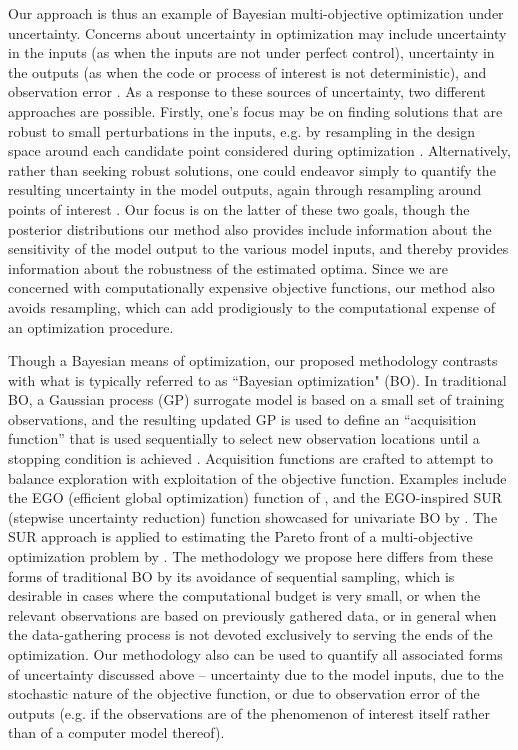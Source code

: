 \documentclass[12pt]{article}
\begin{document}
Our approach is thus an example of Bayesian multi-objective optimization under uncertainty. Concerns about uncertainty in optimization may include uncertainty in the inputs (as when the inputs are not under perfect control), uncertainty in the outputs (as when the code or process of interest is not deterministic), and observation error \citep{Jin2005}. 
%
As a response to these sources of uncertainty, two different approaches are possible.
%
Firstly, one's focus may be on finding solutions that are robust to small perturbations in the inputs, e.g. by resampling in the design space around each candidate point considered during optimization \citep{Deb2006}.
%
Alternatively, rather than seeking robust solutions, one could endeavor simply to quantify the resulting uncertainty in the model outputs, again through resampling around points of interest \citep{Zhou2011}.
%
Our focus is on the latter of these two goals, though the posterior distributions our method also provides include information about the sensitivity of the model output to the various model inputs, and thereby provides information about the robustness of the estimated optima.
%
Since we are concerned with computationally expensive objective functions, our method also avoids resampling, which can add prodigiously to the computational expense of an optimization procedure.
%

%
Though a Bayesian means of optimization, our proposed methodology contrasts with what is typically referred to as ``Bayesian optimization" (BO). 
%
In traditional BO, a Gaussian process (GP) surrogate model is based on a small set of training observations, and the resulting updated GP is used to define an ``acquisition function'' that is used sequentially to select new observation locations until a stopping condition is achieved \citep{Picheny2019}.
%
Acquisition functions are crafted to attempt to balance exploration with exploitation of the objective function.
%
Examples include the EGO (efficient global optimization) function of \cite{Jones1998}, and the EGO-inspired SUR (stepwise uncertainty reduction) function showcased for univariate BO by \cite{Chevalier2014}.
%
The SUR approach is applied to estimating the Pareto front of a multi-objective optimization problem by \cite{Picheny2015}.
%
The methodology we propose here differs from these forms of traditional BO by its avoidance of sequential sampling, which is desirable in cases where the computational budget is very small, or when the relevant observations are based on previously gathered data, or in general when the data-gathering process is not devoted exclusively to serving the ends of the optimization.
%
Our methodology also can be used to quantify all associated forms of uncertainty discussed above -- uncertainty due to the model inputs, due to the stochastic nature of the objective function, or due to observation error of the outputs (e.g. if the observations are of the phenomenon of interest itself rather than of a computer model thereof).
%
\end{document}
